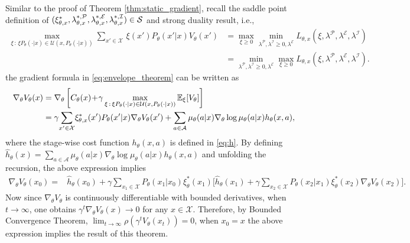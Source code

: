 Similar to the proof of Theorem \ref{thm:static_gradient}, recall the saddle point definition of $(\xi^*_{\theta,x},\lambda^{*,\mathcal P}_{\theta,x},\lambda^{*,\mathcal E}_{\theta,x},\lambda^{*,\mathcal I}_{\theta,x}) \in \mathcal S$ and strong duality result, i.e.,
\begin{equation*}
\begin{split}
\max_{\xi\,:\,\xi P_\theta(\cdot|x)\in\mathcal U(x,P_\theta(\cdot|x))}\sum_{x'  \in \mathcal X} \, \xi(x') P_\theta(x'|x)V_\theta(x')&=\max_{\xi\geq 0}\min_{\lambda^{\mathcal P},\lambda^{\mathcal I}\geq 0,\lambda^{\mathcal E}}L_{\theta,x}(\xi,\lambda^{\mathcal P},\lambda^{\mathcal E},\lambda^{\mathcal I})\\&=\min_{\lambda^{\mathcal P},\lambda^{\mathcal I}\geq 0,\lambda^{\mathcal E}}\max_{\xi\geq 0}L_{\theta,x}(\xi,\lambda^{\mathcal P},\lambda^{\mathcal E},\lambda^{\mathcal I}).
\end{split}
\end{equation*}
the gradient formula in \eqref{eq:envelope_theorem} can be written as
\[
\begin{split}
\nabla_\theta V_\theta(x)&=\nabla_\theta \left[C_\theta(x) \!+\! \gamma\max_{\xi\,:\,\xi P_\theta(\cdot |x)\in {\mathcal{U}}(x,P_\theta(\cdot |x))}\mathbb E_{\xi}[V_\theta]\right]\\
&=\gamma\! \sum_{x'  \in \mathcal X} \! \xi^*_{\theta,x}(x') P_\theta(x'|x)\nabla_\theta V_\theta(x')+\sum_{a\in\mathcal A}\mu_\theta(a|x)\nabla_\theta\log\mu_\theta(a|x)h_\theta(x,a),
\end{split}
\]
where the stage-wise cost function $h_\theta(x,a)$ is defined in \eqref{eq:h}. By defining $\widehat{h}_\theta(x)=\sum_{a\in\mathcal A}\mu_\theta(a|x)\nabla_\theta\log\mu_\theta(a|x)h_\theta(x,a)$ and unfolding the recursion, the above expression implies
\[
\begin{split}
\nabla_\theta V_\theta(x_0)=&\widehat{h}_\theta(x_0)+\gamma\sum_{x_1\in\mathcal X}P_\theta(x_1|x_0)\xi_\theta^*(x_1)\Bigg[\widehat{h}_\theta(x_1)+\gamma \sum_{x_2\in\mathcal X}P_\theta(x_2|x_1)\xi_\theta^*(x_2) \nabla_\theta V_\theta\left(x_2\right)\Bigg].
\end{split}
\]
Now since $\nabla_\theta V_\theta$ is continuously differentiable with bounded derivatives, when $t\rightarrow\infty$, one obtains $\gamma^t\nabla_\theta V_\theta(x)\rightarrow 0$ for any $x\in\mathcal X$. Therefore, by Bounded Convergence Theorem, $\lim_{t\rightarrow\infty}\rho(\gamma^t V_{\theta}(x_t))=0$, when $x_0=x$ the above expression implies the result of this theorem.

